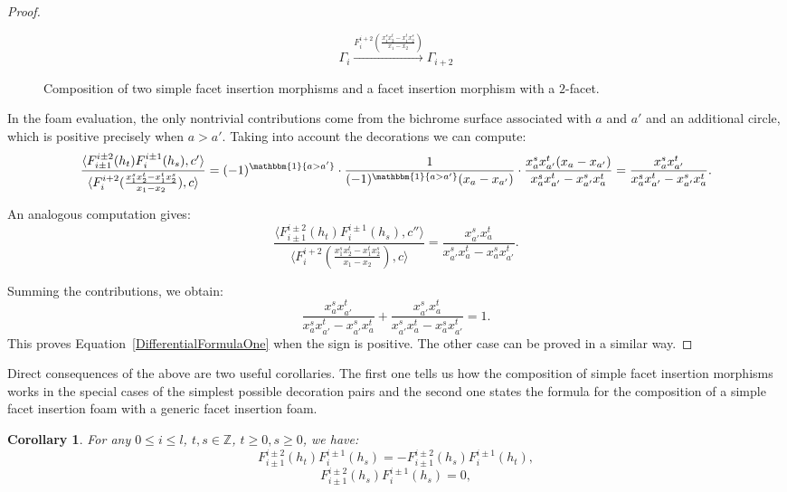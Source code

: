 \documentclass[12pt]{amsart}
\newtheorem{corollary}[theorem]{Corollary}
\theoremstyle{definition}
\theoremstyle{remark}
\numberwithin{equation}{section}
\numberwithin{figure}{section}
\newcommand{\Z}{\mathbb{Z}}
\begin{document}
\begin{proof}
\begin{figure}[htbp]
    $$\Gamma_i\xrightarrow{F_i^{i+2}(\frac{x_1^sx_2^t-x_1^tx_2^s}{x_1-x_2})}\Gamma_{i+2}$$
    \caption{Composition of two simple facet insertion morphisms and a facet insertion morphism with a $2$-facet.}
    \label{fig:double1facet}
  \end{figure}
    In the foam evaluation, the only nontrivial contributions come from the bichrome surface associated with $a$ and $a'$ and an additional circle, which is positive precisely when $a>a'$. Taking into account the decorations we can compute: 
  \[ \frac{\langle F^{i\pm 2}_{i\pm 1}(h_t)F^{i\pm 1}_{i}(h_s),c' \rangle}{\langle F_i^{i+2}(\frac{x_1^sx_2^t-x_1^tx_2^s}{x_1-x_2}), c\rangle}  =(-1)^{\mathbbm{1}\{a>a'\}}\cdot \frac{1}{(-1)^{\mathbbm{1}\{a>a'\}}(x_a-x_{a'})}\cdot \frac{x_a^sx_{a'}^t(x_a-x_{a'})}{x_a^sx_{a'}^t-x_{a'}^sx_{a}^t}=\frac{x_a^sx_{a'}^t}{x_a^sx_{a'}^t-x_{a'}^sx_{a}^t}.\] 
  
  An analogous computation gives:
\[\frac{\langle F^{i\pm 2}_{i\pm 1}(h_t)F^{i\pm 1}_{i}(h_s),c'' \rangle}{\langle F_i^{i+2}(\frac{x_1^sx_2^t-x_1^tx_2^s}{x_1-x_2}), c\rangle}=\frac{x_{a'}^sx_{a}^t}{x_{a'}^sx_{a}^t-x_{a}^sx_{a'}^t}.\]
  
  Summing the contributions, we obtain: 
  \[\frac{x_a^sx_{a'}^t}{x_a^sx_{a'}^t-x_{a'}^sx_{a}^t}+\frac{x_{a'}^sx_{a}^t}{x_{a'}^sx_{a}^t-x_{a}^sx_{a'}^t}=1.\]
  This proves Equation~\ref{DifferentialFormulaOne} when the sign is positive. The other case can be proved in a similar way.
\end{proof}

Direct consequences of the above are two useful corollaries. The first one tells us how the composition of simple facet insertion morphisms works in the special cases of the simplest possible decoration pairs and the second one states the formula for the composition of a simple facet insertion foam with a generic facet insertion foam.

\begin{corollary}\label{cor:composition of slice morphisms}
  For any $0\leq i\leq l$,  $t,s \in \Z$, $t\geq0, s\geq 0$, we have: 
  \begin{equation}
    F^{i\pm 2}_{i\pm 1}(h_t)F^{i\pm 1}_{i}(h_s)=-F^{i\pm 2}_{i\pm 1}(h_s)F^{i\pm 1}_{i}(h_t), 
    \label{ExchangeDecorationFormula}
  \end{equation}
  \begin{equation}
    F^{i\pm 2}_{i\pm 1}(h_s)F^{i\pm 1}_{i}(h_s)=0,
    \label{differentialFormulaTwo}
  \end{equation}
\end{corollary}
\end{document}
